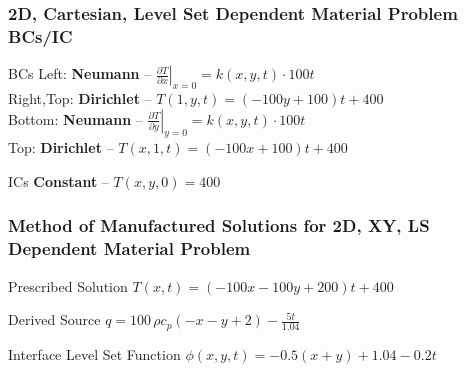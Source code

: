 \documentclass[]{beamer}
\begin{document}
\begin{frame}[t]\frametitle{2D, Cartesian, Level Set Dependent Material Problem BCs/IC}
  \begin{block}{BCs}
    Left: \textbf{Neumann} -- $\left. \frac{\partial T}{\partial x}\right|_{x=0} =
    k(x,y,t)\cdot 100t$ \\
    Right,Top: \textbf{Dirichlet} -- $T(1,y,t) = (-100y + 100)t +400$ \\
    Bottom: \textbf{Neumann} -- $\left. \frac{\partial T}{\partial y}\right|_{y=0} = 
    k(x,y,t)\cdot 100t$ \\
    Top: \textbf{Dirichlet} -- $T(x,1,t) = (-100x + 100)t + 400$
  \end{block}
  
  \begin{block}{ICs}
    \textbf{Constant} -- $T(x,y,0) = 400$
  \end{block}
\end{frame}

\begin{frame}[t]\frametitle{Method of Manufactured Solutions for 2D, XY, LS Dependent Material Problem}
  \begin{block}{Prescribed Solution}
    $T(x,t) = (-100x-100y+200)t + 400$
  \end{block}
  
  \begin{block}{Derived Source}
  $q = 100\,\rho c_p \left(-x-y+2\right) - \frac{5t}{1.04}$
  \end{block}
  
  \begin{block}{Interface Level Set Function}
    $\phi(x,y,t) = -0.5(x+y) + 1.04 - 0.2t$
  \end{block}
\end{frame}
\end{document}
